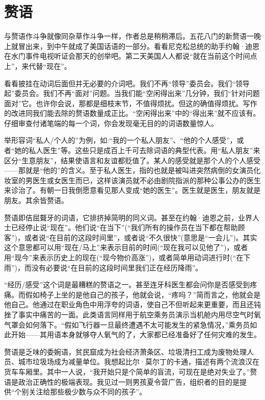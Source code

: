 \chapter{赘语}
与赘语作斗争就像同杂草作斗争一样，作者总是稍稍滞后。五花八门的新赘语一晚上就冒出来，到中午就成了美国话语的一部分。看看尼克松总统的助手约翰·迪恩在水门事件电视听证会那天的创举吧。第二天美国人人都说“就在当前这个时间点上”，来代替“现在”。

看看披挂在动词后面但并无必要的介词吧。我们不再“领导”委员会。我们“领导起”委员会。我们不再“面对”问题。当我们能“空闲得出来”几分钟，我们“针对问题面对”它。也许你会说，那都是细枝末节，不值得烦扰。但这的确值得烦扰。写作的改进同我们能去除的赘语数量成正比。“空闲得出来”中的“得出来”就不应该有。仔细审查付诸笔端的每一个词，你会发现毫无目的的词语数量惊人。

举形容词“私人/个人的”为例，如:“我的一个私人朋友”、“他的个人感受”，或者“她的私人医生”等。这些只是成百上千可去除词语的典型代表。用“私人朋友”来区分“生意朋友”，结果使语言和友谊都贬值了。某人的感受就是那个人的个人感受——那就是“他的”的含义。至于私人医生，指的也就是被叫进突然病倒的女演员化妆室的男医生或女医生而已，这样该演员就不必由剧院指派的那种公事公办的医生来诊治了。有朝一日我倒愿意看见那人变成“她的医生”。医生就是医生，朋友就是朋友。其余皆赘语。

赘语即佶屈聱牙的词语，它排挤掉简明的同义词。甚至在约翰·迪恩之前，业界人士已经停止说“现在”。他们说“在当下”(“我们所有的操作员在当下都在帮助顾客”)，或者说“在目前的这段时间里”，或者说“不久很快”(意思是“一会儿”)。其实这个意思都可以用“现在/马上”来表示目前的时间(“现在我可以见他了”)，或者用“现今”来表示历史上的现在(“现今物价高涨”)，或者简单用动词进行时(“在下雨”)，而没有必要说“在目前的这段时间里我们正在经历降雨”。


“经历/感受”这个词是最糟糕的赘语之一。甚至连牙科医生都会问你是否感受到疼痛。而假如椅子上坐的是他自己的孩子，他就会说，“疼吗？”简而言之，他就会是他自己。他通过在职业角色中用浮夸的词语，使自己不但听起来更重要，而且还钝挫了事实中痛苦的一面。此类语言同样用于航空乘务员演示当机舱内用尽空气时氧气罩会如何落下。“假如飞行器一旦最终遭遇不太可能发生的紧急情况，”乘务员如此开始——其用语本身就够夺人氧气的了，大家都已经准备好了任何灾难的发生。

赘语是乏味的委婉语，贫民窟成为社会经济萧条区、垃圾清扫工成为废物处理人员、城市垃圾场成为减量单位。我想起比尔·莫尔丁的卡通，描述有两个流浪汉在货车车厢里。其中一人说，“我开始只是个简单的盲流，可现在是绝对失业了。”赘语是政治正确性的极端表现。我见过一则男孩夏令营广告，组织者的目的是提供“个别关注给那些极少数与众不同的孩子”。

